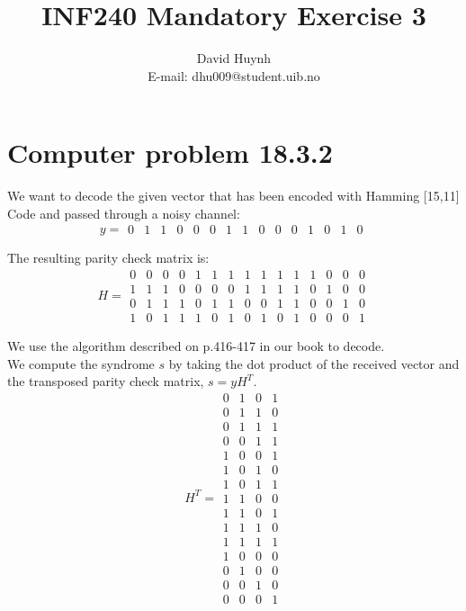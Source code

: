 \documentclass{article}
\begin{document}
\setcounter{MaxMatrixCols}{15}

\title{INF240 Mandatory Exercise 3}
\author{David Huynh\\ E-mail: dhu009@student.uib.no}
\date{}

\maketitle

\section*{Computer problem 18.3.2}

We want to decode the given vector that has been encoded with Hamming [15,11] Code and passed through a noisy channel:\\
$$y=
\begin{matrix}
0 & 1 & 1 & 0 & 0 & 0 & 1 & 1 & 0 & 0 & 0 & 1 & 0 & 1 & 0
\end{matrix}
$$

The resulting parity check matrix is:\\
$$H=
\begin{matrix}
		0 & 0 & 0 & 0 & 1 & 1 & 1 & 1 & 1 & 1 & 1 & 1 & 0 & 0 & 0\\	  
		1 & 1 & 1 & 0 & 0 & 0 & 0 & 1 & 1 & 1 & 1 & 0 & 1 & 0 & 0\\
		0 & 1 & 1 & 1 & 0 & 1 & 1 & 0 & 0 & 1 & 1 & 0 & 0 & 1 & 0\\
		1 & 0 & 1 & 1 & 1 & 0 & 1 & 0 & 1 & 0 & 1 & 0 & 0 & 0 & 1
\end{matrix}
$$

We use the algorithm described on p.416-417 in our book to decode.\\

We compute the syndrome $s$ by taking the dot product of the received vector and the transposed parity check matrix, $s=yH^{T}$.\\
$$H^{T} = 
\begin{matrix}
	0 & 1 & 0 & 1\\ 
	0 & 1 & 1 & 0\\
	0 & 1 & 1 & 1 \\
	0 & 0 &1 & 1\\
	1 & 0 & 0 & 1 \\
	1 & 0 & 1 & 0 \\
	1 & 0 & 1 & 1 \\
	1 & 1 & 0 & 0 \\
	1 & 1 & 0 & 1 \\
	1 & 1 & 1 & 0 \\
	1 & 1 & 1 & 1 \\
	1 & 0 & 0 & 0 \\
	0 & 1 & 0 & 0 \\
	0 & 0 & 1 & 0 \\
	0 & 0 & 0 & 1 
\end{matrix}
$$
\end{document}
